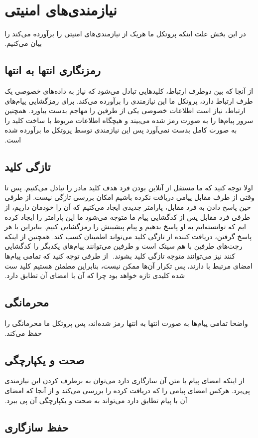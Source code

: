 ‫\section{نیازمندی‌های امنیتی}
‫در این بخش علت اینکه پروتکل ما هریک از نیازمندی‌های امنیتی را برآورده می‌کند را بیان می‌کنیم.
‫
‫\subsection{رمزنگاری انتها به انتها}
‫از آنجا که بین دوطرف ارتباط، کلیدهایی تبادل می‌شود که نیاز به داده‌های خصوصی یک طرف ارتباط دارد، پروتکل ما این نیازمندی را برآورده می‌کند. برای رمزگشایی پیام‌های ارتباط، نیاز است اطلاعات خصوصی یکی از طرفین را مهاجم بدست بیاورد. همچنین سرور پیام‌ها را به صورت رمز شده می‌بیند و هیچگاه اطلاعات مربوط با ساخت کلید را به صورت کامل بدست نمی‌آورد پس این نیازمندی توسط پروتکل ما برآورده شده است.
‫
‫\subsection{تازگی کلید}
‫اولا توجه کنید که ما مستقل از آنلاین بودن فرد هدف کلید مادر را تبادل می‌کنیم. پس تا وقتی از طرف مقابل پیامی دریافت نکرده باشیم امکان بررسی تازگی نیست. از طرفی حین پاسخ دادن به فرد مقابل، پارامتر جدیدی ایجاد می‌کنیم که آن را خودمان داریم، از طرفی فرد مقابل پس از کدگشایی پیام ما متوجه می‌شود ما این پارامتر را ایجاد کرده ایم که توانسته‌ایم به او پاسخ بدهیم و پیام پیشینش را رمزگشایی کنیم. بنابراین با هر پاسخ گرفتن، دریافت کننده از تازگی کلید می‌تواند اطمینان کسب کند. همچنین از اینکه رچت‌های طرفین با هم سینک است و طرفین می‌توانند پیام‌های یکدیگر را کدگشایی کنند نیز می‌توانند متوجه تازگی کلید بشوند.
‫
‫از طرفی توجه کنید که تمامی پیام‌ها امضای مرتبط با  دارند، پس تکرار آن‌ها ممکن نیست، بنابراین مطمئن هستیم کلید ست شده کلیدی تازه خواهد بود چرا که  آن با امضای آن تطابق دارد.
‫
‫\subsection{محرمانگی}
‫واضحا تمامی پیام‌ها به صورت انتها به انتها رمز شده‌اند، پس پروتکل ما محرمانگی را حفظ می‌کند.
‫
‫\subsection{صحت و یکپارچگی}
‫از اینکه امضای پیام با متن آن سازگاری دارد می‌توان به برطرف کردن این نیازمندی پی‌برد. هرکس امضای پیامی را که دریافت کرده را بررسی می‌کند و از آنجا که امضای آن با پیام تطابق دارد می‌تواند به صحت و یکپارچگی آن پی ببرد.
‫
‫\subsection{حفظ سازگاری}
